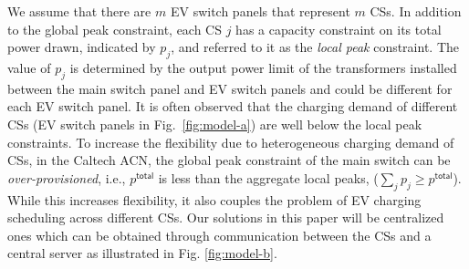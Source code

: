 \documentclass[journal]{IEEEtran}
\newcommand{\rev}[1]{{\color{black}#1}}%
\newcommand{\rev}[1]{#1}
\begin{document}
We assume that there are $m$ EV switch panels that represent $m$ CSs. In addition to the global peak constraint, each CS $j$ has \rev{a} capacity constraint on \rev{its} total power drawn, indicated by $p_j$, and referred to it as the \emph{local peak} constraint. The \rev{value of} $p_j$ is determined by the output power limit of the transformers installed between the main switch panel and EV switch panels and could be different for each EV switch panel.  
\rev{It is often observed that the charging demand of different CSs (EV switch panels in Fig.~\ref{fig:model-a}) are well below the local peak constraints.}
To increase the flexibility due to heterogeneous charging demand of CSs, in the Caltech ACN, the global peak constraint of the main switch can be \textit{over-provisioned}, i.e., $p^\mathsf{total}$ is less than the aggregate local peaks,  ($\sum_j p_j\geq p^\mathsf{total}$). \rev{While this increases flexibility, it also couples the problem of EV charging scheduling across different CSs.}
Our solutions in this paper will be centralized ones which can be obtained through communication between the CSs and a central server as illustrated in Fig. \ref{fig:model-b}.


\end{document}
